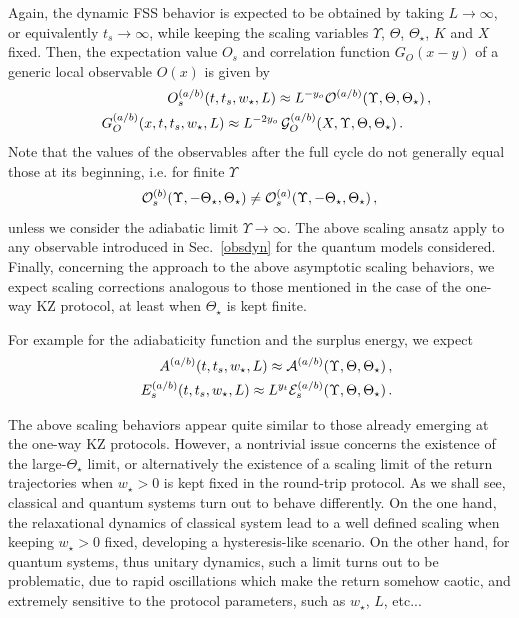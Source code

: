 Again, the dynamic FSS behavior is expected to be obtained by taking
$L\to\infty$, or equivalently $t_s\to\infty$, while keeping the
scaling variables $\Upsilon$, $\Theta$, $\Theta_\star$, $K$ and $X$
fixed.  Then, the expectation value $O_s$ and correlation function
$G_O(x-y)$ of a generic local observable $O(x)$ is given by
\begin{eqnarray}
  &&  O_s^{(a/b)}(t,t_s,w_\star,L) \approx 
  L^{-y_o} {\cal O}^{(a/b)}(\Upsilon,\Theta,\Theta_\star)\,,
  \label{genOscart}\\
&&    G_O^{(a/b)}(x,t,t_s,w_\star,L) \approx L^{-2y_o}\,
  {\cal G}_O^{(a/b)}(X,\Upsilon,\Theta,\Theta_\star)\,.\qquad
  \nonumber
\end{eqnarray}
Note that the values of the observables after the full cycle do not
generally equal those at its beginning, i.e. for finite $\Upsilon$
\begin{equation}
  {\cal O}_s^{(b)}(\Upsilon,-\Theta_{\star},\Theta_\star)
  \neq {\cal O}_s^{(a)}(\Upsilon,-\Theta_{\star},\Theta_\star)\,,
  \label{disacy}
  \end{equation}
unless we consider the adiabatic limit $\Upsilon\to\infty$.  The above
scaling ansatz apply to any observable introduced in Sec.~\ref{obsdyn}
for the quantum models considered. Finally, concerning the approach to
the above asymptotic scaling behaviors, we expect scaling corrections
analogous to those mentioned in the case of the one-way KZ protocol,
at least when $\Theta_\star$ is kept finite.

For example for the adiabaticity function and the surplus energy,
we expect
\begin{eqnarray}
  &&  A^{(a/b)}(t,t_s,w_\star,L) \approx
  {\cal A}^{(a/b)}(\Upsilon,\Theta,\Theta_\star)\,,
  \label{asca3}\\
  &&  E_s^{(a/b)}(t,t_s,w_\star,L) \approx L^{y_t}
        {\cal E}_s^{(a/b)}(\Upsilon,\Theta,\Theta_\star)\,.
  \label{esca3}  
\end{eqnarray}




The above scaling behaviors appear quite similar to those already
emerging at the one-way KZ protocols. However, a nontrivial issue
concerns the existence of the large-$\Theta_\star$ limit, or
alternatively the existence of a scaling limit of the return
trajectories when $w_\star>0$ is kept fixed in the round-trip
protocol. As we shall see, classical and quantum systems turn out to
behave differently. On the one hand, the relaxational dynamics of
classical system lead to a well defined scaling when keeping
$w_\star>0$ fixed, developing a hysteresis-like scenario. On the other
hand, for quantum systems, thus unitary dynamics, such a limit turns
out to be problematic, due to rapid oscillations which make the return
somehow caotic, and extremely sensitive to the protocol parameters,
such as $w_\star$, $L$, etc...

